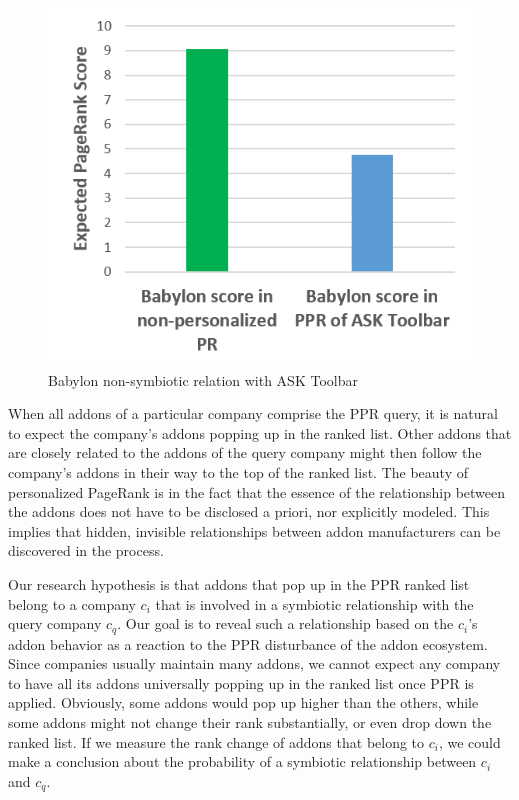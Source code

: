 \documentclass[ijoc,nonblindrev]{informs3} %
\numberwithin{equation}{subsection}
\begin{document}
\begin{figure}[!htbp]
\centering
\includegraphics[width=\linewidth]{figures/babylon_nosym_ask.png}
\caption{Babylon non-symbiotic relation with ASK Toolbar}
\label{fig:babylon_nosym_ask}
\end{figure}
\fi

When all addons of a particular company comprise the PPR query, it is natural to expect the company's addons popping up in the ranked list. Other addons that are closely related to the addons of the query company might then follow the company's addons in their way to the top of the ranked list. The beauty of personalized PageRank is in the fact that the essence of the relationship between the addons does not have to be disclosed a priori, nor explicitly modeled. This implies that hidden, invisible relationships between addon manufacturers can be discovered in the process.

Our research hypothesis is that addons that pop up in the PPR ranked list belong to a company $c_i$ that is involved in a symbiotic relationship with the query company $c_q$. Our goal is to reveal such a relationship based on the $c_i$'s addon behavior as a reaction to the PPR disturbance of the addon ecosystem. Since companies usually maintain many addons, we cannot expect any company to have all its addons universally popping up in the ranked list once PPR is applied. Obviously, some addons would pop up higher than the others, while some addons might not change their rank substantially, or even drop down the ranked list. If we measure the rank change of addons that belong to $c_i$, we could make a conclusion about the probability of a symbiotic relationship between $c_i$ and $c_q$. 
\end{document}

